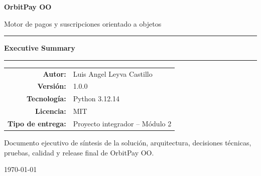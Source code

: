 \documentclass[11pt,a4paper]{article}
\begin{document}
\begin{titlepage}
    \centering

    \vspace*{2.0cm}

    {\Huge\bfseries\color{orbitblue} OrbitPay OO\par}

    \vspace{0.5cm}

    {\Large Motor de pagos y suscripciones orientado a objetos\par}

    \vspace{1.5cm}

    \rule{\textwidth}{1pt}

    \vspace{0.6cm}

    {\LARGE\bfseries Executive Summary\par}

    \vspace{0.6cm}

    \rule{\textwidth}{1pt}

    \vspace{2cm}

    \begin{tabular}{rl}
        \textbf{Autor:} & Luis Angel Leyva Castillo \\[0.3cm]
        \textbf{Versión:} & 1.0.0 \\[0.3cm]
        \textbf{Tecnología:} & Python 3.12.14 \\[0.3cm]
        \textbf{Licencia:} & MIT \\[0.3cm]
        \textbf{Tipo de entrega:} &
        Proyecto integrador -- Módulo 2
    \end{tabular}

    \vfill

    \begin{minipage}{0.82\textwidth}
        \centering
        \small
        Documento ejecutivo de síntesis de la solución,
        arquitectura, decisiones técnicas, pruebas,
        calidad y release final de OrbitPay OO.
    \end{minipage}

    \vspace{1cm}

    {\small \today}

\end{titlepage}
\end{document}
